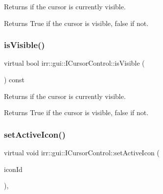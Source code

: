 Returns if the cursor is currently visible. 

\begin{DoxyReturn}{Returns}
True if the cursor is visible, false if not. 
\end{DoxyReturn}
\mbox{\label{classirr_1_1gui_1_1ICursorControl_ae1d1ca4c1c3042388881fabda4e53a42}} 
\subsubsection{\texorpdfstring{is\+Visible()}{isVisible()}\hspace{0.1cm}{\footnotesize\ttfamily [2/2]}}
{\footnotesize\ttfamily virtual bool irr\+::gui\+::\+I\+Cursor\+Control\+::is\+Visible (\begin{DoxyParamCaption}{ }\end{DoxyParamCaption}) const\hspace{0.3cm}{\ttfamily [pure virtual]}}



Returns if the cursor is currently visible. 

\begin{DoxyReturn}{Returns}
True if the cursor is visible, false if not. 
\end{DoxyReturn}
\mbox{\label{classirr_1_1gui_1_1ICursorControl_af394700d5279b13cc0f2bcdad679469c}} 
\subsubsection{\texorpdfstring{set\+Active\+Icon()}{setActiveIcon()}\hspace{0.1cm}{\footnotesize\ttfamily [1/2]}}
{\footnotesize\ttfamily virtual void irr\+::gui\+::\+I\+Cursor\+Control\+::set\+Active\+Icon (\begin{DoxyParamCaption}\item[{\hyperlink{namespaceirr_1_1gui_aefee802dd632c5735703e40ef40f879b}{E\+C\+U\+R\+S\+O\+R\+\_\+\+I\+C\+ON}}]{icon\+Id }\end{DoxyParamCaption})\hspace{0.3cm}{\ttfamily [inline]}, {\ttfamily [virtual]}}



